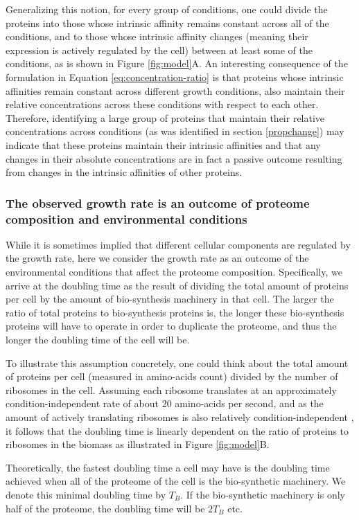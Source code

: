 \documentclass[notitlepage]{article}
\begin{document}
Generalizing this notion, for every group of conditions, one could divide the proteins into those whose intrinsic affinity remains constant across all of the conditions, and to those whose intrinsic affinity changes (meaning their expression is actively regulated by the cell) between at least some of the conditions, as is shown in Figure \ref{fig:model}A.
An interesting consequence of the formulation in Equation \ref{eq:concentration-ratio} is that proteins whose intrinsic affinities remain constant across different growth conditions, also maintain their relative concentrations across these conditions with respect to each other.
Therefore, identifying a large group of proteins that maintain their relative concentrations across conditions (as was identified in section \ref{propchange}) may indicate that these proteins maintain their intrinsic affinities and that any changes in their absolute concentrations are in fact a passive outcome resulting from changes in the intrinsic affinities of other proteins.

\subsubsection{The observed growth rate is an outcome of proteome composition and environmental conditions}
While it is sometimes implied that different cellular components are regulated by the growth rate, here we consider the growth rate as an outcome of the environmental conditions that affect the proteome composition.
Specifically, we arrive at the doubling time as the result of dividing the total amount of proteins per cell by the amount of bio-synthesis machinery in that cell.
The larger the ratio of total proteins to bio-synthesis proteins is, the longer these bio-synthesis proteins will have to operate in order to duplicate the proteome, and thus the longer the doubling time of the cell will be.

To illustrate this assumption concretely, one could think about the total amount of proteins per cell (measured in amino-acids count) divided by the number of ribosomes in the cell.
Assuming each ribosome translates at an approximately condition-independent rate of about 20 amino-acids per second, and as the amount of actively translating ribosomes is also relatively condition-independent \cite{Philips2009}, it follows that the doubling time is linearly dependent on the ratio of proteins to ribosomes in the biomass as illustrated in Figure \ref{fig:model}B.

Theoretically, the fastest doubling time a cell may have is the doubling time achieved when all of the proteome of the cell is the bio-synthetic machinery.
We denote this minimal doubling time by $T_B$.
If the bio-synthetic machinery is only half of the proteome, the doubling time will be $2T_B$ etc.
\end{document}
